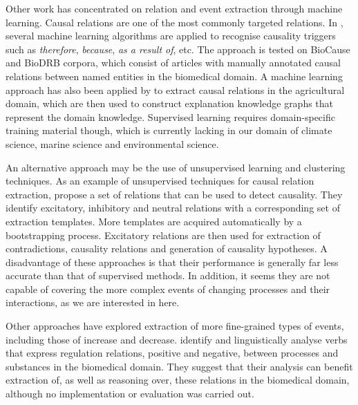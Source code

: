 \documentclass[10pt, a4paper]{article}
\begin{document}
Other work has concentrated on relation and event extraction through machine learning. 
Causal relations are one of the most commonly targeted relations.
In \cite{Mihaila2013}, several machine learning algorithms are applied to recognise causality triggers such as \emph{therefore}, \emph{because}, \emph{as a result of}, etc.
The approach is tested on BioCause \cite{Mihaila2013BioCause} and BioDRB \cite{Prasad2011Biomedical} corpora, which consist of articles with manually annotated causal relations between named entities in the biomedical domain. 
A machine learning approach has also been applied by  to extract causal relations in the agricultural domain, which are then used to construct explanation knowledge graphs that represent the domain knowledge.
Supervised learning requires domain-specific training material though, which is currently lacking in our domain of climate science, marine science and environmental science.

An alternative approach may be the use of unsupervised learning and clustering techniques. 
As an example of unsupervised techniques for causal relation extraction,  propose a set of relations that can be used to detect causality. 
They identify excitatory, inhibitory and neutral relations with a corresponding set of extraction templates. 
More templates are acquired automatically by a bootstrapping process. 
Excitatory relations are then used for extraction of contradictions, causality relations and generation of causality hypotheses.
A disadvantage of these approaches is that their performance is generally far less accurate than that of supervised methods.
In addition, it seems they are not capable of covering the more complex events of changing processes and their interactions, as we are interested in here. 

Other approaches have explored extraction of more fine-grained types of events, including those of increase and decrease. 
 identify and linguistically analyse verbs that express regulation relations, positive and negative, between processes and substances in the biomedical domain. 
They suggest that their analysis can benefit extraction of, as well as reasoning over, these relations in the biomedical domain, although no implementation or evaluation was carried out.
\end{document}
